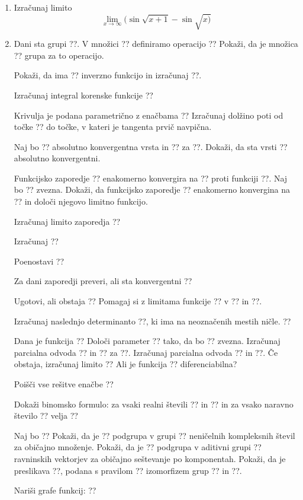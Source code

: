 \documentclass[a4paper,12pt]{article}
\begin{document}
\begin{enumerate}
\item Izračunaj limito
$$\lim_{x\to \infty} (\sin \sqrt{x+1} - \sin \sqrt{x)}$$

\item Dani sta grupi ??. V množici ?? definiramo operacijo
??
Pokaži, da je množica ?? grupa za to operacijo.

Pokaži, da ima ?? inverzno funkcijo in izračunaj ??.

Izračunaj integral korenske funkcije
??

Krivulja je podana parametrično z enačbama
??
Izračunaj dolžino poti od točke ?? do točke, v kateri je tangenta prvič navpična.

Naj bo ?? absolutno konvergentna vrsta in ?? za ??.
Dokaži, da sta vrsti
??
absolutno konvergentni.

Funkcijsko zaporedje ?? enakomerno konvergira na ?? proti funkciji ??.
Naj bo ?? zvezna. Dokaži, da funkcijsko zaporedje ??
enakomerno konvergina na ?? in določi njegovo limitno funkcijo.

Izračunaj limito zaporedja
??

Izračunaj
??

Poenostavi
??

Za dani zaporedji preveri, ali sta konvergentni
??

Ugotovi, ali obstaja
??
Pomagaj si z limitama funkcije ?? v ?? in ??.

Izračunaj naslednjo determinanto ??, ki ima na neoznačenih mestih ničle.
??

Dana je funkcija
??
Določi parameter ?? tako, da bo ?? zvezna.
Izračunaj parcialna odvoda ?? in ?? za ??.
Izračunaj parcialna odvoda ?? in ??.
Če obstaja, izračunaj limito
??
Ali je funkcija ?? diferenciabilna?

Poišči vse rešitve enačbe
??

Dokaži binomsko formulo: za vsaki realni števili ?? in ?? in za vsako naravno število ?? velja
??

Naj bo
??
Pokaži, da je ?? podgrupa v grupi ??
neničelnih kompleksnih števil za običajno množenje.
Pokaži, da je ?? podgrupa v aditivni grupi ??
ravninskih vektorjev za običajno seštevanje po komponentah.
Pokaži, da je preslikava ??, podana s pravilom
??
izomorfizem grup ?? in ??.

Nariši grafe funkcij:
??
\end{enumerate}
\end{document}
